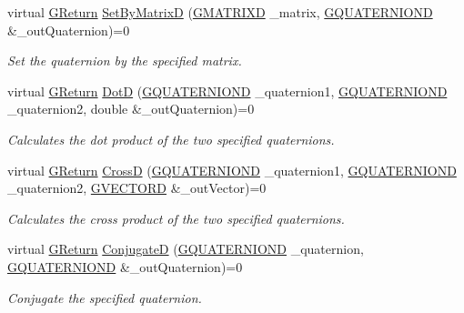 \begin{DoxyCompactItemize}
virtual \hyperlink{namespaceGW_a67a839e3df7ea8a5c5686613a7a3de21}{G\+Return} \hyperlink{classGW_1_1MATH_1_1GQuaternion_a22539c93e600bce0d09081eeec368c9c}{Set\+By\+MatrixD} (\hyperlink{structGW_1_1MATH_1_1GMATRIXD}{G\+M\+A\+T\+R\+I\+XD} \+\_\+matrix, \hyperlink{structGW_1_1MATH_1_1GQUATERNIOND}{G\+Q\+U\+A\+T\+E\+R\+N\+I\+O\+ND} \&\+\_\+out\+Quaternion)=0
\begin{DoxyCompactList}\small\item\em Set the quaternion by the specified matrix. \end{DoxyCompactList}\item 
virtual \hyperlink{namespaceGW_a67a839e3df7ea8a5c5686613a7a3de21}{G\+Return} \hyperlink{classGW_1_1MATH_1_1GQuaternion_acffef6fd3e2d5f726428f2c09a4c6a72}{DotD} (\hyperlink{structGW_1_1MATH_1_1GQUATERNIOND}{G\+Q\+U\+A\+T\+E\+R\+N\+I\+O\+ND} \+\_\+quaternion1, \hyperlink{structGW_1_1MATH_1_1GQUATERNIOND}{G\+Q\+U\+A\+T\+E\+R\+N\+I\+O\+ND} \+\_\+quaternion2, double \&\+\_\+out\+Quaternion)=0
\begin{DoxyCompactList}\small\item\em Calculates the dot product of the two specified quaternions. \end{DoxyCompactList}\item 
virtual \hyperlink{namespaceGW_a67a839e3df7ea8a5c5686613a7a3de21}{G\+Return} \hyperlink{classGW_1_1MATH_1_1GQuaternion_a2a2d62bed9008f304a64a32baad1a1ac}{CrossD} (\hyperlink{structGW_1_1MATH_1_1GQUATERNIOND}{G\+Q\+U\+A\+T\+E\+R\+N\+I\+O\+ND} \+\_\+quaternion1, \hyperlink{structGW_1_1MATH_1_1GQUATERNIOND}{G\+Q\+U\+A\+T\+E\+R\+N\+I\+O\+ND} \+\_\+quaternion2, \hyperlink{structGW_1_1MATH_1_1GVECTORD}{G\+V\+E\+C\+T\+O\+RD} \&\+\_\+out\+Vector)=0
\begin{DoxyCompactList}\small\item\em Calculates the cross product of the two specified quaternions. \end{DoxyCompactList}\item 
virtual \hyperlink{namespaceGW_a67a839e3df7ea8a5c5686613a7a3de21}{G\+Return} \hyperlink{classGW_1_1MATH_1_1GQuaternion_af15dde55d52feeb62a3193353529b63c}{ConjugateD} (\hyperlink{structGW_1_1MATH_1_1GQUATERNIOND}{G\+Q\+U\+A\+T\+E\+R\+N\+I\+O\+ND} \+\_\+quaternion, \hyperlink{structGW_1_1MATH_1_1GQUATERNIOND}{G\+Q\+U\+A\+T\+E\+R\+N\+I\+O\+ND} \&\+\_\+out\+Quaternion)=0
\begin{DoxyCompactList}\small\item\em Conjugate the specified quaternion. \end{DoxyCompactList}\item 

\end{DoxyCompactItemize}

